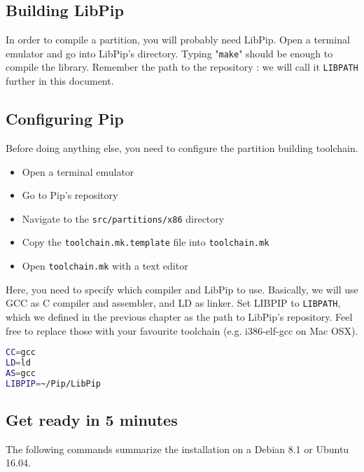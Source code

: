 \documentclass[10pt,a4paper,titlepage]{refart}
\begin{document}
\subsection{Building LibPip}
In order to compile a partition, you will probably need LibPip.
Open a terminal emulator and go into LibPip's directory. Typing
"\texttt{make}" should be enough to compile the library. Remember the
path to the repository : we will call it \texttt{LIBPATH} further in this document.

\subsection{Configuring Pip}
Before doing anything else, you need to configure the partition building toolchain.
\begin{itemize}
\item Open a terminal emulator
\item Go to Pip's repository
\item Navigate to the \texttt{src/partitions/x86} directory
\item Copy the \texttt{toolchain.mk.template} file into \texttt{toolchain.mk}
\item Open \texttt{toolchain.mk} with a text editor
\end{itemize}

Here, you need to specify which compiler and LibPip to
use. Basically, we will use GCC as C compiler and assembler, and LD as linker. Set LIBPIP to \texttt{LIBPATH}, which we defined in the previous chapter as the path to LibPip's repository. Feel free to replace those with your favourite toolchain (e.g. i386-elf-gcc on Mac OSX).
\begin{lstlisting}[language=bash,caption={\texttt{toolchain.mk} configuration}]
CC=gcc
LD=ld
AS=gcc
LIBPIP=~/Pip/LibPip
\end{lstlisting}

\subsection{Get ready in 5 minutes}
\label{sec:getready}

The following commands summarize the installation on a Debian 8.1 or Ubuntu 16.04.
\end{document}
